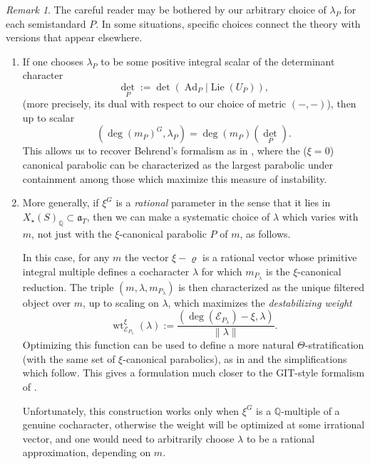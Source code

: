 \documentclass[openany]{amsbook}
\theoremstyle{definition}
\theoremstyle{remark}
\newtheorem{remark}[theorem]{Remark}
\numberwithin{equation}{section}
\newcommand{\Q}{\mathbb{Q}}
\newcommand{\cE}{\mathcal{E}}
\renewcommand{\-}{\operatorname{-}}
\newcommand{\wt}{\operatorname{wt}}
\renewcommand{\a}{\mathfrak{a}}
\newcommand{\on}[1]{\operatorname{#1}}
\newcommand{\Lie}{\on{Lie}}
\newcommand{\Ad}{\on{Ad}}
\begin{document}
\begin{remark}\label{rmk.choice.of.cochars}
    The careful reader may be bothered by our arbitrary choice of $\lambda_P$ for each semistandard $P$. In some situations, specific choices connect the theory with versions that appear elsewhere. 
    \begin{enumerate}
        \item If one chooses $\lambda_P$ to be some positive integral scalar of the determinant character
        $$
            \det_P := \det(\Ad_P | \Lie(U_P)),
        $$
        (more precisely, its dual with respect to our choice of metric $(-, -)$), then up to scalar 
        $$
            (\deg(m_P)^G, \lambda_P) = \deg(m_P)(\det_P).
        $$
        This allows us to recover Behrend's formalism as in \cite{behrendsemistable}, where the ($\xi = 0$) canonical parabolic can be characterized as the largest parabolic under containment among those which maximize this measure of instability. 
        \item More generally, if $\xi^G$ is a \textit{rational} parameter in the sense that it lies in $X_\star(S)_{\Q} \subset \a_T$, then we can make a systematic choice of $\lambda$ which varies with $m$, not just with the $\xi$-canonical parabolic $P$ of $m$, as follows.
        
        In this case, for any $m$ the vector $\xi - \varrho$ is a rational vector whose primitive integral multiple defines a cocharacter $\lambda$ for which $m_{P_\lambda}$ is the $\xi$-canonical reduction. The triple $(m, \lambda, m_{P_\lambda})$ is then characterized as the unique filtered object over $m$, up to scaling on $\lambda$, which maximizes the \emph{destabilizing weight} 
        $$
        \wt_{\cE_{P_\lambda}}^\xi(\lambda) := \frac{(\deg(\cE_{P_\lambda}) - \xi, \lambda)}{\|\lambda\|}.
        $$
        Optimizing this function can be used to define a more natural $\Theta$-stratification (with the same set of $\xi$-canonical parabolics), as in \cite[Theorem 2.2.2]{HalpernLeistnerInstability} and the simplifications which follow. This gives a formulation much closer to the GIT-style formalism of \cite{kempf}. 
        
        Unfortunately, this construction works only when $\xi^G$ is a $\Q$-multiple of a genuine cocharacter, otherwise the weight will be optimized at some irrational vector, and one would need to arbitrarily choose $\lambda$ to be a rational approximation, depending on $m$.
    \end{enumerate}
\end{remark}
\end{document}
